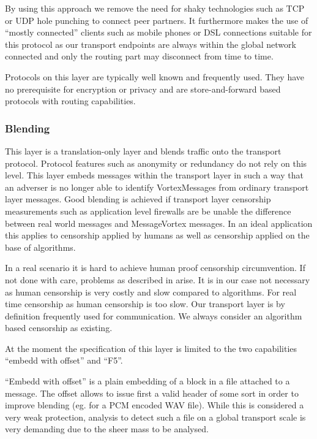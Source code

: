 \documentclass[9pt,journal,compsoc]{IEEEtran}
\begin{document}
By using this approach we remove the need for shaky technologies such as TCP or UDP hole punching to connect peer partners. It furthermore makes the use of ``mostly connected'' clients such as mobile phones or DSL connections suitable for this protocol as our transport endpoints are always within the global network connected and only the routing part may disconnect from time to time. 

Protocols on this layer are typically well known and frequently used. They have no prerequisite for encryption or privacy and are store-and-forward based protocols with routing capabilities. 

\subsubsection{Blending}
This layer is a translation-only layer and blends traffic onto the transport protocol. Protocol features such as anonymity or redundancy do not rely on this level. This layer embeds messages within the transport layer in such a way that an adverser is no longer able to identify VortexMessages from ordinary transport layer messages. Good blending is achieved if transport layer censorship measurements such as application level firewalls are be unable the difference between real world messages and MessageVortex messages. In an ideal application this applies to censorship applied by humans as well as censorship applied on the base of algorithms. 

In a real scenario it is hard to achieve human proof censorship circumvention. If not done with care, problems as described in \cite{abadi2005moderately} arise. It is in our case not necessary as human censorship is very costly and slow compared to algorithms. For real time censorship as human censorship is too slow. Our transport layer is by definition frequently used for communication. We always consider an algorithm based censorship as existing.

At the moment the specification of this layer is limited to the two capabilities ``embedd with offset'' and ``F5''. 

``Embedd with offset'' is a plain embedding of a block in a file attached to a message. The offset allows to issue first a valid header of some sort in order to improve blending (eg. for a PCM encoded WAV file). While this is considered a very weak protection, analysis to detect such a file on a global transport scale is very demanding due to the sheer mass to be analysed. 
\end{document}
